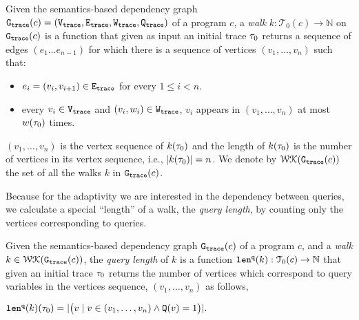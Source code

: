 
\begin{defn}
\label{def:finitewalk}
Given the semantics-based dependency graph $\mathtt{{G_{trace}}}({c}) = (\mathtt{{V_{trace}}}, \mathtt{{E_{trace}}}, \mathtt{{W_{trace}}}, \mathtt{{Q_{trace}}})$ of a program $c$, a \emph{walk} $k:\mathcal{T}_0(c)\to \mathbb{N}$ on $\mathtt{{G_{trace}}}({c})$ is a function that given as input an initial trace $\mathtt{\tau}_0$ returns a sequence of edges $(e_1 \ldots e_{n - 1})$ 
for which there is a sequence of vertices $(v_1, \ldots, v_{n})$ such that:
\begin{itemize}
\item $e_i = (v_{i},v_{i + 1}) \in \mathtt{{E_{trace}}}$ for every $1 \leq i < n$.
\item every $v_i \in \mathtt{{V_{trace}}}$ and $(v_i, w_i) \in \mathtt{{W_{trace}}}$, $v_i$ appears in $(v_1, \ldots, v_{n})$ at most $w(\mathtt{\tau}_0)$ times.  
\end{itemize}
{$(v_1, \ldots, v_{n})$ is the vertex sequence of $k(\mathtt{\tau}_0)$ and the length of $k(\mathtt{\tau}_0)$ is the number of vertices in its vertex sequence, i.e., $|k(\mathtt{\tau}_0)| = n$.}
We denote by $\mathcal{WK}(\mathtt{{G_{trace}}}(c))$
the set of all the  walks $k$ in $\mathtt{{G_{trace}}}(c)$.
\end{defn} 
Because for the adaptivity
we are interested in the dependency between queries,
we calculate a special ``length'' of a walk, the \emph{query length},  by counting only the vertices
corresponding to queries.
\begin{defn}
\label{def:qlen}
Given 
the semantics-based dependency graph $\mathtt{{G_{trace}}}({c})$ of a program $c$,
 and a \emph{walk} 
 $k \in \mathcal{WK}(\mathtt{{G_{trace}}}(c))$, the \emph{query length} of $k$ is a function $\mathtt{len}^{\tt q}(k):\mathcal{T}_0(c) \to \mathbb{N}$ that given an initial trace $\mathtt{\tau}_0$ returns
the number of vertices which correspond to query variables in the vertices sequence, $(v_1, \ldots, v_{n})$ as follows, 
\begin{center}
   $
  \mathtt{len}^{\tt q}(k)(\mathtt{\tau}_0) = |\big( v \mid v \in (v_1, \ldots, v_{n}) \land \mathtt{Q}(v) = 1 \big)|.
$
\end{center}
\end{defn}
